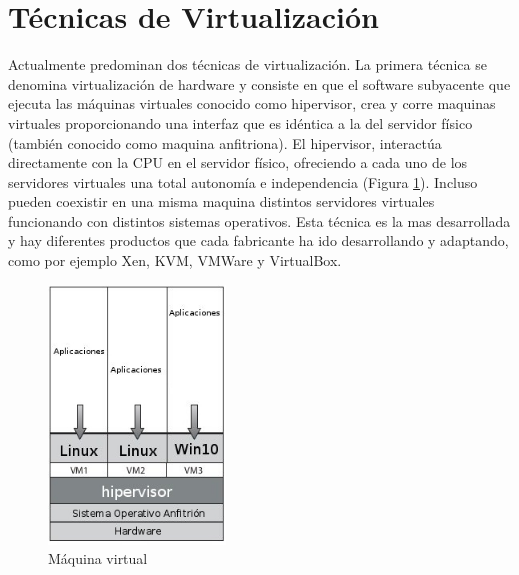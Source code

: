 \section{Técnicas de Virtualización}
Actualmente predominan dos técnicas de virtualización. La primera técnica se denomina virtualización de hardware y consiste en que el software subyacente que ejecuta las máquinas virtuales conocido como hipervisor, crea y corre maquinas virtuales proporcionando una interfaz que es idéntica a la del servidor físico (también conocido como maquina anfitriona). El hipervisor, interactúa directamente con la CPU en el servidor físico, ofreciendo a cada uno de los servidores virtuales una total autonomía e independencia (Figura \ref{fig:hipervisor}). Incluso pueden coexistir en una misma maquina distintos servidores virtuales funcionando con distintos sistemas operativos. Esta técnica es la mas desarrollada y hay diferentes productos que cada fabricante ha ido desarrollando y adaptando, como por ejemplo Xen, KVM, VMWare y VirtualBox.\\

\begin{figure}[h]
    \centering
	\caption{Máquina virtual}
	\label{fig:hipervisor}
	\includegraphics[width = 0.42\textwidth]{../architecture/v1/diagrams/virtualmachine}
\end{figure}

